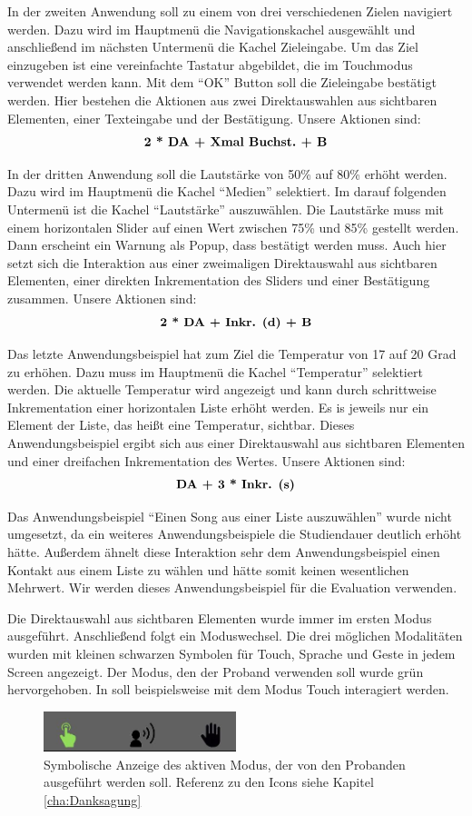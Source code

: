 In der zweiten Anwendung soll zu einem von drei verschiedenen Zielen navigiert werden. 
Dazu wird im Hauptmenü die Navigationskachel ausgewählt und anschließend im nächsten Untermenü die Kachel Zieleingabe. 
Um das Ziel einzugeben ist eine vereinfachte Tastatur abgebildet, die im Touchmodus verwendet werden kann. 
Mit dem "`OK"' Button soll die Zieleingabe bestätigt werden. 
Hier bestehen die Aktionen aus zwei Direktauswahlen aus sichtbaren Elementen, einer Texteingabe und der Bestätigung. 
Unsere Aktionen sind:
$$\textbf{2 * \text{DA} + \text{Xmal Buchst.} + \text{B}}$$

In der dritten Anwendung soll die Lautstärke von 50\% auf 80\% erhöht werden. 
Dazu wird im Hauptmenü die Kachel "`Medien"' selektiert. 
Im darauf folgenden Untermenü ist die Kachel "`Lautstärke"' auszuwählen. 
Die Lautstärke muss mit einem horizontalen Slider auf einen Wert zwischen 75\% und 85\% gestellt werden. 
Dann erscheint ein Warnung als Popup, dass bestätigt werden muss. 
Auch hier setzt sich die Interaktion aus einer zweimaligen Direktauswahl aus sichtbaren Elementen, einer direkten Inkrementation des Sliders und einer Bestätigung zusammen.
Unsere Aktionen sind:
$$\textbf{2 * \text{DA} + \text{Inkr. (d)} + \text{B}}$$

Das letzte Anwendungsbeispiel hat zum Ziel die Temperatur von 17 auf 20 Grad zu erhöhen. 
Dazu muss im Hauptmenü die Kachel "`Temperatur"' selektiert werden. 
Die aktuelle Temperatur wird angezeigt und kann durch schrittweise Inkrementation einer horizontalen Liste erhöht werden.
Es is jeweils nur ein Element der Liste, das heißt eine Temperatur, sichtbar.
Dieses Anwendungsbeispiel ergibt sich aus einer Direktauswahl aus sichtbaren Elementen und einer dreifachen Inkrementation des Wertes. 
Unsere Aktionen sind:
$$\textbf{\text{DA} + 3 * \text{Inkr. (s)}}$$

Das Anwendungsbeispiel "`Einen Song aus einer Liste auszuwählen"' wurde nicht umgesetzt, da ein weiteres  Anwendungsbeispiele die Studiendauer deutlich erhöht hätte. 
Außerdem ähnelt diese Interaktion sehr dem Anwendungsbeispiel einen Kontakt aus einem Liste zu wählen und hätte somit keinen wesentlichen Mehrwert. 
Wir werden dieses Anwendungsbeispiel für die Evaluation verwenden.

Die Direktauswahl aus sichtbaren Elementen wurde immer im ersten Modus ausgeführt.
Anschließend folgt ein Moduswechsel. 
Die drei möglichen Modalitäten wurden mit kleinen schwarzen Symbolen für Touch, Sprache und Geste in jedem Screen angezeigt. 
Der Modus, den der Proband verwenden soll wurde grün hervorgehoben. 
In  soll beispielsweise mit dem Modus Touch interagiert werden. 
\begin{figure}[ht]
  \centering
  \includegraphics[width=0.5\textwidth]{img/ModusAktiv.jpg}
  \caption[Symbolische Anzeige des aktiven Modus]{Symbolische Anzeige des aktiven Modus, der von den Probanden ausgeführt werden soll. Referenz zu den Icons siehe Kapitel \ref{cha:Danksagung}}
  \label{fig:ModusAktiv}
\end{figure}

